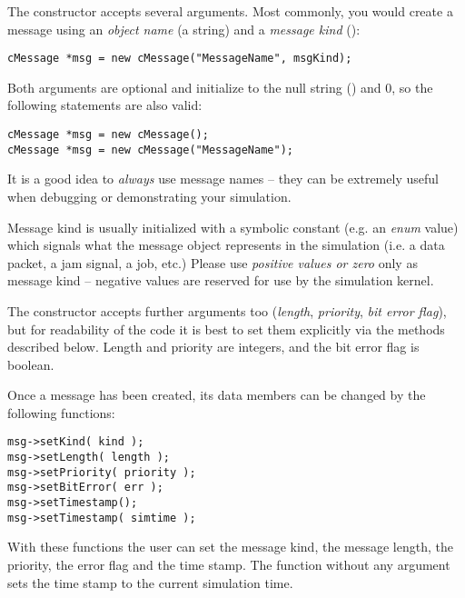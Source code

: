 The  constructor accepts several arguments.
Most commonly, you would create a message using an \textit{object name}
(a  string) and a \textit{message kind} ():

\begin{verbatim}
cMessage *msg = new cMessage("MessageName", msgKind);
\end{verbatim}

Both arguments are optional and initialize to the null string ()
and 0, so the following statements are also valid:

\begin{verbatim}
cMessage *msg = new cMessage();
cMessage *msg = new cMessage("MessageName");
\end{verbatim}

It is a good idea to \textit{always} use message names -- they can be
extremely useful when debugging or demonstrating your simulation.

Message kind is usually initialized with a symbolic constant
(e.g. an \textit{enum} value) which signals what the message object
represents in the simulation (i.e. a data packet, a jam signal, a job, etc.)
Please use \textit{positive values or zero} only as message kind --
negative values are reserved for use by the simulation kernel.


The  constructor accepts further arguments too
(\textit{length}, \textit{priority}, \textit{bit error flag}),
but for readability of the code it is best to set them explicitly
via the  methods described below.
Length and priority are integers, and the bit error flag is boolean.



Once a message has been created, its data members can be changed by the following functions:

\begin{verbatim}
msg->setKind( kind );
msg->setLength( length );
msg->setPriority( priority );
msg->setBitError( err );
msg->setTimestamp();
msg->setTimestamp( simtime );
\end{verbatim}


With these functions the user can set the message
kind, the message length,
the priority, the error
flag and the time stamp. The  function without any argument
sets the time stamp to the current simulation time.


